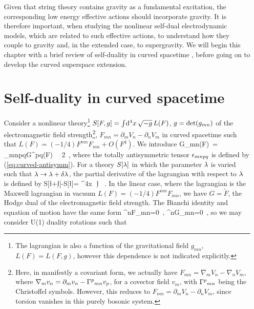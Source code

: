 Given that string theory contains gravity as a fundamental excitation, the corresponding low energy effective actions should incorporate gravity. It is therefore important, when studying the nonlinear self-dual electrodynamic models, which are related to such effective actions, to understand how they couple to gravity and, in the extended case, to supergravity. We will begin this chapter with a brief review of self-duality in curved spacetime \cite{Gibbons:1995cv,Gibbons:1995ap,Gibbons:2000mx}, before going on to develop the curved superspace extension.


\vskip0.5cm
\section{Self-duality in curved spacetime}\label{sec:non-susy-sd}
\noindent Consider a nonlinear theory\footnote{The lagrangian is also a function of the gravitational field $g_{mn}$, $L(F)=L(F,g)$, however this dependence is not indicated explicitly.} $S[F,g]=\int\!{\rm d}^4x \,\sqrt{-g}\,L(F)$, $g={\rm det}(g_{mn})$ of the electromagnetic field strength\footnote{Here, in manifestly a covariant form, we actually have $F_{mn}=\nabla_m V_n-\nabla_n V_m$, where $\nabla_m v_n=\partial_{m}v_{n}-\Gamma^{p}{}_{mn}v_{p}$, for a covector field $v_m$, with $\Gamma^{p}{}_{mn}$ being the Christoffel symbols. However, this reduces to $F_{mn}=\partial_m V_n-\partial_n V_m$, since torsion vanishes in this purely bosonic system.}, $F_{mn}=\partial_m V_n-\partial_n V_m$ in curved spacetime such that $L(F)=(-1/4)F^{mn}F_{mn}+O(F^4)$. We introduce
\be
{\tilde G}_{mn}(F)~=~
\e_{mnpq}G^{pq}(F)~\equiv~
2~,
\ee
where the totally antisymmetric tensor $\epsilon_{mnpq}$ is defined by (\ref{eq:curved-antisymm}). For a theory $S[\lambda]$ in which the parameter $\lambda$ is varied such that $\lambda\to\lambda+\delta\lambda$, the partial derivative of the lagrangian with respect to $\lambda$ is defined by
\be
S[\l+\d \l]-S[\l]=
\int{}^4x \,\,\d \l
{}~.
\ee
In the linear case, where the lagrangian is the Maxwell lagrangian in vacuum $L(F)=(-1/4)F^{mn}F_{mn}$, we have $G={\tilde F}$, the Hodge dual of the electromagnetic field strength. The Bianchi identity and equation of motion have the same form
\be
\nabla^{n}{\tilde F}_{mn}=0~,\quad\qquad
\nabla^{n}{\tilde G}_{mn}=0~,
\ee
so we may consider U(1) duality rotations such that
\bea
\label{eq:em-duality-rotation}
